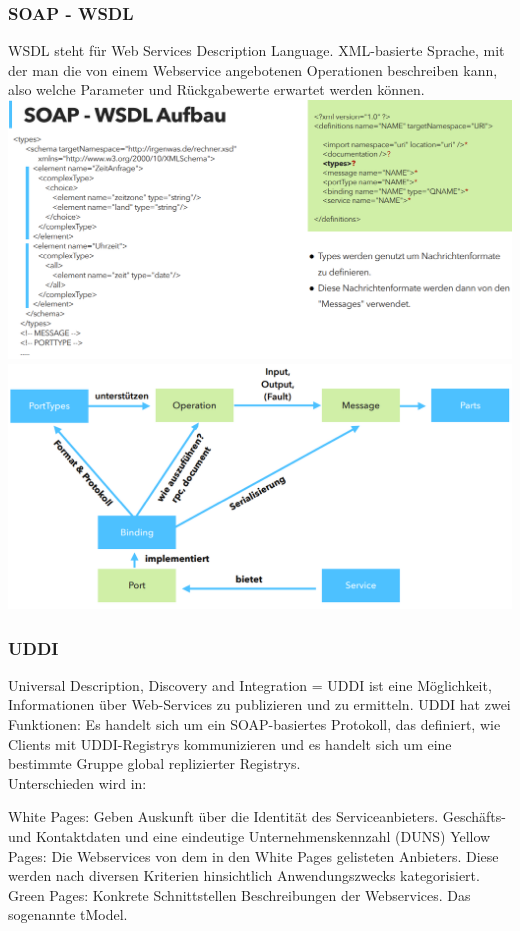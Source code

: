 \documentclass[12pt,a4paper]{article}
\begin{document}
\subsubsection{SOAP - WSDL}
WSDL steht für Web Services Description Language. XML-basierte Sprache, mit der man die von einem Webservice angebotenen Operationen beschreiben kann, also welche Parameter und Rückgabewerte erwartet werden können.\\
\includegraphics[width=\textwidth]{Bilder/wsdl.PNG}
\includegraphics[width=\textwidth]{Bilder/wsdl2.PNG}

\subsubsection{UDDI}
Universal Description, Discovery and Integration = UDDI ist eine Möglichkeit, Informationen über Web-Services zu publizieren und zu ermitteln. UDDI hat zwei Funktionen: Es handelt sich um ein SOAP-basiertes Protokoll, das definiert, wie Clients mit UDDI-Registrys kommunizieren und es handelt sich um eine bestimmte Gruppe global replizierter Registrys.\\
Unterschieden wird in:\\
\begin{outline}
	\1 White Pages:
		\2 Geben Auskunft über die Identität des Serviceanbieters. Geschäfts- und Kontaktdaten und eine eindeutige Unternehmenskennzahl (DUNS)
	\1 Yellow Pages:
		\2 Die Webservices von dem in den White Pages gelisteten Anbieters.
		\2 Diese werden nach diversen Kriterien hinsichtlich Anwendungszwecks kategorisiert.
	\1 Green Pages:
		\2 Konkrete Schnittstellen Beschreibungen der Webservices. Das sogenannte tModel.
\end{outline}
\end{document}
